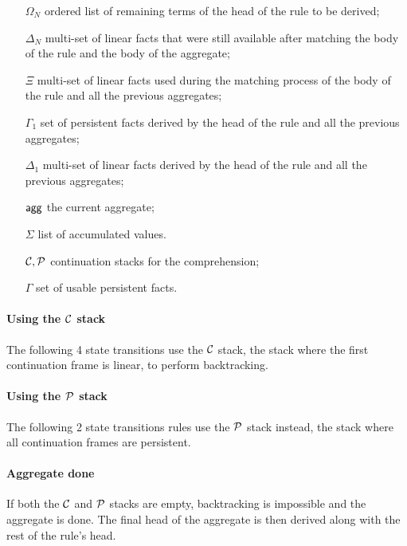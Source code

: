 \begin{enumerate}
   \item[$\Omega_N$] ordered list of remaining terms of the head of the rule to
   be derived;
   \item[$\Delta_N$] multi-set of linear facts that were still available after
   matching the body of the rule and the body of the aggregate;
   \item[$\Xi$] multi-set of linear facts used during the matching process of
   the body of the rule and all the previous aggregates;
   \item[$\Gamma_{1}$] set of persistent facts derived by the head of the rule
   and all the previous aggregates;
   \item[$\Delta_{1}$] multi-set of linear facts derived by the head of the
   rule and all the previous aggregates;
   \item[$\mathsf{agg}$] the current aggregate;
   \item[$\Sigma$] list of accumulated values.
   \item[$\mathcal{C}, \mathcal{P}$] continuation stacks for the comprehension;
   \item[$\Gamma$] set of usable persistent facts.
\end{enumerate}

\paragraph{Using the $\mathcal{C}$ stack}

The following 4 state transitions use the $\mathcal{C}$ stack, the stack where the
first continuation frame is linear, to perform backtracking.



\paragraph{Using the $\mathcal{P}$ stack}

The following 2 state transitions rules use the $\mathcal{P}$ stack instead, the stack where all
continuation frames are persistent.



\paragraph{Aggregate done}

If both the $\mathcal{C}$ and $\mathcal{P}$ stacks are empty, backtracking is
impossible and the aggregate is done. The final head of the aggregate is then
derived along with the rest of the rule's head.

